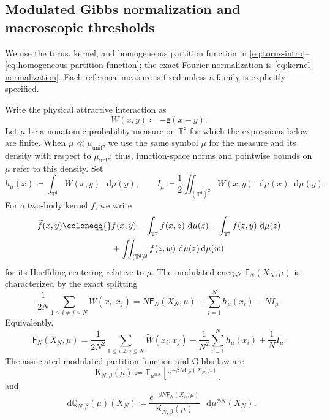 \documentclass[11pt,reqno]{amsart}
\numberwithin{equation}{section}
\theoremstyle{plain}
\theoremstyle{definition}
\renewcommand{\d}{\mathsf d}
\newcommand{\dd}{\mathop{}\!\mathrm d}
\newcommand{\T}{\mathbb T}
\newcommand{\E}{\mathbb E}
\newcommand{\Q}{\mathbb Q}
\newcommand{\be}{\beta}
\newcommand{\g}{\mathsf g}
\newcommand{\K}{\mathsf K}
\newcommand{\Fr}{\mathsf F}
\newcommand{\tl}{\widetilde}
\newcommand{\muunif}{\mu_{\mathrm{unif}}}
\newcommand{\XN}{X_N}
\begin{document}
\subsection{Modulated Gibbs normalization and macroscopic thresholds}

We use the torus, kernel, and homogeneous partition function in \eqref{eq:torus-intro}--\eqref{eq:homogeneous-partition-function}; the exact Fourier normalization is \eqref{eq:kernel-normalization}. Each reference measure is fixed unless a family is explicitly specified.


Write the physical attractive interaction as
\begin{equation}
 W(x,y)\coloneqq-\g(x-y).
 \label{eq:attractive-interaction}
\end{equation}
Let $\mu$ be a nonatomic probability measure on $\T^{\d}$ for which the expressions below are finite.  When $\mu\ll\muunif$, we use the same symbol $\mu$ for the measure and its density with respect to $\muunif$; thus, function-space norms and pointwise bounds on $\mu$ refer to this density.  Set
\begin{equation}
 h_{\mu}(x)\coloneqq\int_{\T^{\d}}W(x,y)\,\dd\mu(y),
 \qquad
 I_{\mu}\coloneqq\frac12\iint_{(\T^{\d})^2}W(x,y)\,\dd\mu(x)\dd\mu(y).
 \label{eq:hmu-imu-definition}
\end{equation}
For a two-body kernel $f$, we write
\begin{align}
 \tl f(x,y)
 \coloneqq{}&f(x,y)-\int_{\T^{\d}}f(x,z)\,\dd\mu(z)
 -\int_{\T^{\d}}f(z,y)\,\dd\mu(z)
 \notag\\
 &+\iint_{(\T^{\d})^2}f(z,w)\,\dd\mu(z)\dd\mu(w)
 \label{eq:hoeffding-centering}
\end{align}
for its Hoeffding centering relative to $\mu$.  The modulated energy $\Fr_N(\XN,\mu)$ is characterized by the exact splitting
\begin{equation}
 \frac1{2N}\sum_{1\leq i\neq j\leq N}W(x_i,x_j)
 =N\Fr_N(\XN,\mu)+\sum_{i=1}^Nh_{\mu}(x_i)-NI_{\mu}.
 \label{eq:intro-modulated-splitting}
\end{equation}
Equivalently,
\begin{equation}
 \Fr_N(\XN,\mu)
 =\frac1{2N^2}\sum_{1\leq i\neq j\leq N}\tl W(x_i,x_j)
 -\frac1{N^2}\sum_{i=1}^Nh_{\mu}(x_i)+\frac1N I_{\mu}.
 \label{eq:modulated-energy-general-reference}
\end{equation}
The associated modulated partition function and Gibbs law are
\begin{equation}
 \K_{N,\be}(\mu)
 \coloneqq\E_{\mu^{\otimes N}}\left[e^{-\be N\Fr_N(\XN,\mu)}\right]
 \label{eq:partition-general-reference}
\end{equation}
and
\begin{equation}
 \dd\Q_{N,\be}(\mu)(\XN)
 \coloneqq\frac{e^{-\be N\Fr_N(\XN,\mu)}}{\K_{N,\be}(\mu)}
 \,\dd\mu^{\otimes N}(\XN).
 \label{eq:modulated-gibbs-law}
\end{equation}
\end{document}
